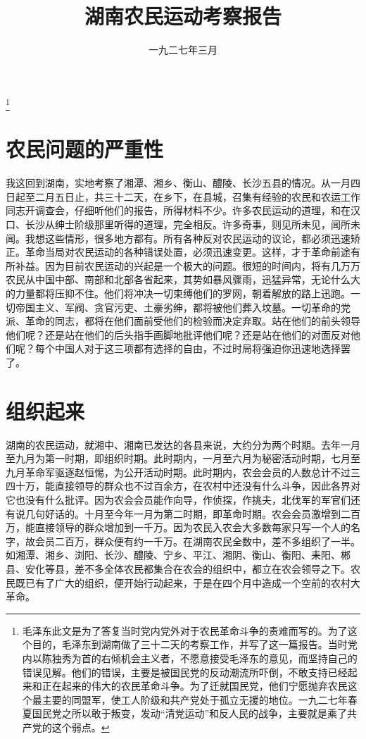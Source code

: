 
\title{湖南农民运动考察报告}
\date{一九二七年三月}
\thanks{毛泽东此文是为了答复当时党内党外对于农民革命斗争的责难而写的。为了这个目的，毛泽东到湖南做了三十二天的考察工作，并写了这一篇报告。当时党内以陈独秀为首的右倾机会主义者，不愿意接受毛泽东的意见，而坚持自己的错误见解。他们的错误，主要是被国民党的反动潮流所吓倒，不敢支持已经起来和正在起来的伟大的农民革命斗争。为了迁就国民党，他们宁愿抛弃农民这个最主要的同盟军，使工人阶级和共产党处于孤立无援的地位。一九二七年春夏国民党之所以敢于叛变，发动“清党运动”和反人民的战争，主要就是乘了共产党的这个弱点。}
\maketitle


\section{农民问题的严重性}

我这回到湖南，实地考察了湘潭、湘乡、衡山、醴陵、长沙五县的情况。从一月四日起至二月五日止，共三十二天，在乡下，在县城，召集有经验的农民和农运工作同志开调查会，仔细听他们的报告，所得材料不少。许多农民运动的道理，和在汉口、长沙从绅士阶级那里听得的道理，完全相反。许多奇事，则见所未见，闻所未闻。我想这些情形，很多地方都有。所有各种反对农民运动的议论，都必须迅速矫正。革命当局对农民运动的各种错误处置，必须迅速变更。这样，才于革命前途有所补益。因为目前农民运动的兴起是一个极大的问题。很短的时间内，将有几万万农民从中国中部、南部和北部各省起来，其势如暴风骤雨，迅猛异常，无论什么大的力量都将压抑不住。他们将冲决一切束缚他们的罗网，朝着解放的路上迅跑。一切帝国主义、军阀、贪官污吏、土豪劣绅，都将被他们葬入坟墓。一切革命的党派、革命的同志，都将在他们面前受他们的检验而决定弃取。站在他们的前头领导他们呢？还是站在他们的后头指手画脚地批评他们呢？还是站在他们的对面反对他们呢？每个中国人对于这三项都有选择的自由，不过时局将强迫你迅速地选择罢了。

\section{组织起来}

湖南的农民运动，就湘中、湘南已发达的各县来说，大约分为两个时期。去年一月至九月为第一时期，即组织时期。此时期内，一月至六月为秘密活动时期，七月至九月革命军驱逐赵恒惕，为公开活动时期。此时期内，农会会员的人数总计不过三四十万，能直接领导的群众也不过百余方，在农村中还没有什么斗争，因此各界对它也没有什么批评。因为农会会员能作向导，作侦探，作挑夫，北伐军的军官们还有说几句好话的。十月至今年一月为第二时期，即革命时期。农会会员激增到二百万，能直接领导的群众增加到一千万。因为农民入农会大多数每家只写一个人的名字，故会员二百万，群众便有约一千万。在湖南农民全数中，差不多组织了一半。如湘潭、湘乡、浏阳、长沙、醴陵、宁乡、平江、湘阴、衡山、衡阳、耒阳、郴县、安化等县，差不多全体农民都集合在农会的组织中，都立在农会领导之下。农民既已有了广大的组织，便开始行动起来，于是在四个月中造成一个空前的农村大革命。

